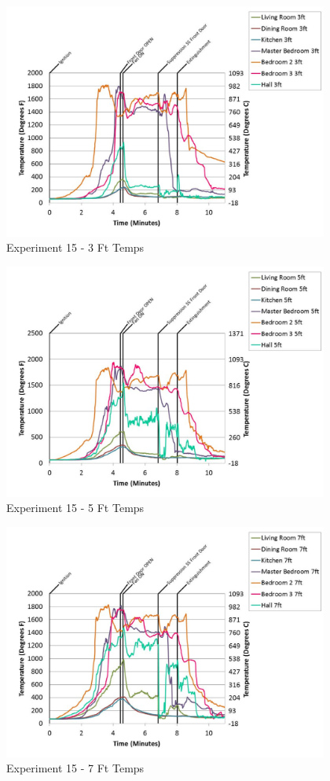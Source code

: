\documentclass{article}
\begin{document}
\begin{appendices}
	\begin{figure}[h!]
		\centering
		\includegraphics[height=3.05in]{0_Images/Results_Charts/Exp_15_Charts/3FtTemps.pdf}
		\caption{Experiment 15 - 3 Ft Temps}
	\end{figure}
 
	\clearpage

	\begin{figure}[h!]
		\centering
		\includegraphics[height=3.05in]{0_Images/Results_Charts/Exp_15_Charts/5FtTemps.pdf}
		\caption{Experiment 15 - 5 Ft Temps}
	\end{figure}
 

	\begin{figure}[h!]
		\centering
		\includegraphics[height=3.05in]{0_Images/Results_Charts/Exp_15_Charts/7FtTemps.pdf}
		\caption{Experiment 15 - 7 Ft Temps}
	\end{figure}
 

\end{appendices}
\end{document}
